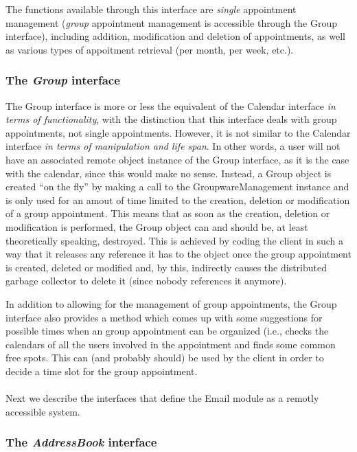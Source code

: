 \documentclass[a4paper,10pt]{article}
\begin{document}
The functions available through this interface are \emph{single} appointment management
(\emph{group} appointment management is accessible through the Group interface), including
addition, modification and deletion of appointments, as well as various types of appoitment
retrieval (per month, per week, etc.).

\subsubsection*{The \emph{Group} interface}

The Group interface is more or less the equivalent of the Calendar interface \emph{in terms of
functionality}, with the distinction that this interface deals with group appointments, not single
appointments. However, it is not similar to the Calendar interface \emph{in terms of manipulation
and life span}. In other words, a user will not have an associated remote object instance of the
Group interface, as it is the case with the calendar, since this would make no sense. Instead,
a Group object is created ``on the fly'' by making a call to the GroupwareManagement instance
and is only used for an amout of time limited to the creation, deletion or modification of a group
appointment. This means that as soon as the creation, deletion or modification is performed, the
Group object can and should be, at least theoretically speaking, destroyed. This is achieved by
coding the client in such a way that it releases any reference it has to the object once the group
appointment is created, deleted or modified and, by this, indirectly causes the distributed garbage
collector to delete it (since nobody references it anymore).

In addition to allowing for the management of group appointments, the Group interface also provides
a method which comes up with some suggestions for possible times when an group appointment
can be organized (i.e., checks the calendars of all the users involved in the appointment and finds
some common free spots. This can (and probably should) be used by the client in order to decide
a time slot for the group appointment.\\
\\
Next we describe the interfaces that define the Email module as a remotly accessible system.

\subsubsection*{The \emph{AddressBook} interface}
\end{document}
